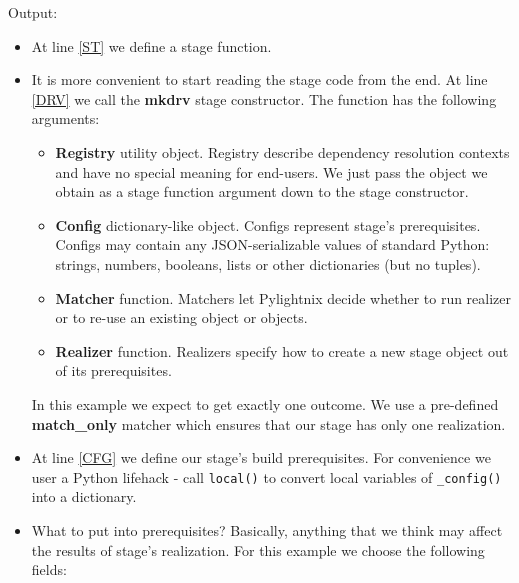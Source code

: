 Output:

\mysmallstdout

\begin{itemize}
  \item At line \ref{ST} we define a stage function.

  \item It is more convenient to start reading the stage code from the end.  At
    line \ref{DRV} we call the \textbf{mkdrv} stage constructor. The function
    has the following arguments:

    \begin{itemize}

      \item \textbf{Registry} utility object. Registry describe dependency
        resolution contexts and have no special meaning for end-users. We just
        pass the object we obtain as a stage function argument down to the stage
        constructor.

      \item \textbf{Config} dictionary-like object. Configs represent stage's
        prerequisites. Configs may contain any JSON-serializable values of
        standard Python: strings, numbers, booleans, lists or other dictionaries
        (but no tuples).

      \item \textbf{Matcher} function. Matchers let Pylightnix decide whether to
        run realizer or to re-use an existing object or objects.

      \item \textbf{Realizer} function. Realizers specify how to create a new
        stage object out of its prerequisites.

    \end{itemize}

    In this example we expect to get exactly one outcome. We use a pre-defined
    \textbf{match\_only} matcher which ensures that our stage has only one
    realization.

  \item At line \ref{CFG} we define our stage's build prerequisites. For
    convenience we user a Python lifehack - call \texttt{local()} to convert
    local variables of \texttt{\_config()} into a dictionary.

  \item What to put into prerequisites? Basically, anything that we think may
    affect the results of stage's realization. For this example we choose the
    following fields:


\end{itemize}
